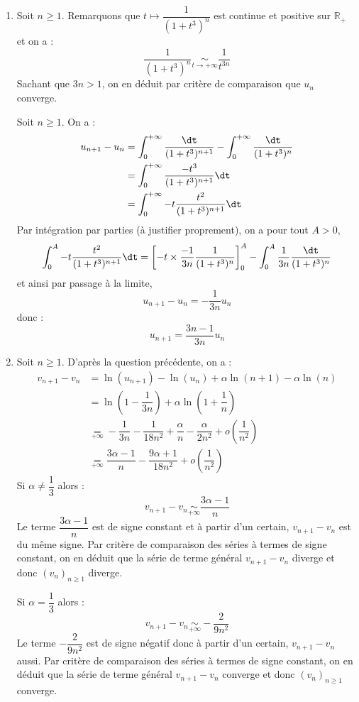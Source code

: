 \documentclass[a4paper,10pt]{report}
\begin{document}
\corr \begin{enumerate}
\item Soit $n \geq 1$. Remarquons que $t \mapsto \dfrac{1}{(1+t^3)^n}$ est continue et positive sur $\mathbb{R}_+$ et on a :
$$ \dfrac{1}{(1+t^3)^n} \underset{t \rightarrow + \infty}{\sim} \dfrac{1}{t^{3n}}$$
Sachant que $3n>1$, on en déduit par critère de comparaison que $u_n$ converge.

\medskip

\noindent Soit $n \geq 1$. On a :
\begin{align*}
 u_{n+1} - u_n &  =  \int_{0}^{+ \infty} \dfrac{\dt}{(1+t^3)^{n+1}} -  \int_{0}^{+ \infty} \dfrac{\dt}{(1+t^3)^n} \\
 & = \int_{0}^{+ \infty} \dfrac{-t^3}{(1+t^3)^{n+1}} \dt \\
 & =  \int_{0}^{+ \infty} - t \dfrac{t^2}{(1+t^3)^{n+1}} \dt
\end{align*}
Par intégration par parties (à justifier proprement), on a pour tout $A>0$,
$$ \int_{0}^A  - t \dfrac{t^2}{(1+t^3)^{n+1}} \dt = \left[-t \times \dfrac{-1}{3n} \dfrac{1}{(1+t^3)^n} \right]_0^A -\int_{0}^A \dfrac{1}{3n} \dfrac{\dt}{(1+t^3)^n}$$
et ainsi par passage à la limite,
$$ u_{n+1}-u_n = -\dfrac{1}{3n} u_n$$
donc :
$$ u_{n+1} = \dfrac{3n-1}{3n} u_n$$

\item Soit $n \geq 1$. D'après la question précédente, on a :
\begin{align*}
v_{n+1}-v_n & = \ln(u_{n+1})- \ln(u_n) + \alpha \ln(n+1)- \alpha \ln(n) \\
& = \ln \left(1 - \dfrac{1}{3n} \right) + \alpha \ln \left(1 + \dfrac{1}{n} \right) \\
& \underset{+ \infty}{=} - \dfrac{1}{3n} - \dfrac{1}{18n^2} + \dfrac{\alpha}{n}- \dfrac{\alpha}{2n^2} + o \left( \dfrac{1}{n^2} \right) \\
& \underset{+ \infty}{=} \dfrac{3 \alpha-1}{n} - \dfrac{9\alpha+1}{18n^2}+ o \left( \dfrac{1}{n^2}\right)
\end{align*}
Si $\alpha \neq \dfrac{1}{3}$ alors :
$$ v_{n+1}-v_n \underset{+ \infty}{\sim} \dfrac{3 \alpha-1}{n}$$
Le terme $\dfrac{3 \alpha-1}{n}$ est de signe constant et à partir d'un certain, $v_{n+1}-v_n$ est du même signe. Par critère de comparaison des séries à termes de signe constant, on en déduit que la série de terme général $v_{n+1}-v_n$ diverge et donc $(v_n)_{n \geq 1}$ diverge. 

\medskip

\noindent Si $\alpha = \dfrac{1}{3}$ alors :
$$ v_{n+1}-v_n \underset{+ \infty}{\sim} - \dfrac{2}{9n^2} $$
Le terme $-\dfrac{2}{9n^2}$ est de signe négatif donc à partir d'un certain, $v_{n+1}-v_n$ aussi. Par critère de comparaison des séries à termes de signe constant, on en déduit que la série de terme général $v_{n+1}-v_n$ converge et donc $(v_n)_{n \geq 1}$ converge. 


\end{enumerate}
\end{document}
